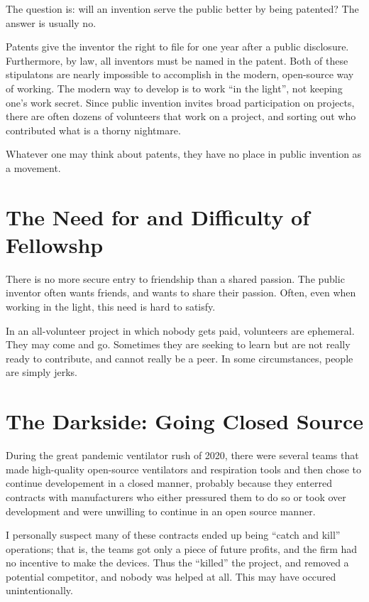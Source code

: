 \documentclass[
	fontsize=10pt, %
	twoside=false, %
	secnumdepth=1, %
]{kaobook}
\begin{document}
The question is: will an invention serve the public better
by being patented? The answer is usually no.

Patents give the inventor the right to file for one year
after a public disclosure. Furthermore, by law,
all inventors must be named in the patent. Both
of these stipulatons are nearly impossible to accomplish
in the modern, open-source way of working.
The modern way to develop is to work ``in the light'',
not keeping one's work secret.
Since public invention invites broad participation on projects,
there are often dozens of volunteers that work on a project,
and sorting out who contributed what is a thorny nightmare.

Whatever one may think about patents, they have no
place in public invention as a movement.

\section{The Need for and Difficulty of Fellowshp}

There is no more secure entry to friendship than a shared passion.
The public inventor often wants friends, and wants to share
their passion.
Often, even when working in the light, this need
is hard to satisfy.

In an all-volunteer project in which nobody gets paid,
volunteers are ephemeral. They may come and go.
Sometimes they are seeking to learn but are not
really ready to contribute, and cannot really
be a peer.
In some circumstances, people are simply jerks.

\section{The Darkside: Going Closed Source}

During the great pandemic ventilator rush of 2020,
there were several teams that made high-quality
open-source ventilators and respiration tools and
then chose to continue developement in a closed manner,
probably because they enterred contracts with manufacturers
who either pressured them to do so or took over development
and were unwilling to continue in an open source manner.

I personally suspect many of these contracts ended
up being ``catch and kill'' operations; that is,
the teams got only a piece of future profits, and
the firm had no incentive to make the devices.
Thus the ``killed'' the project, and removed a potential
competitor, and nobody was helped at all.
This may have occured unintentionally.
\end{document}
